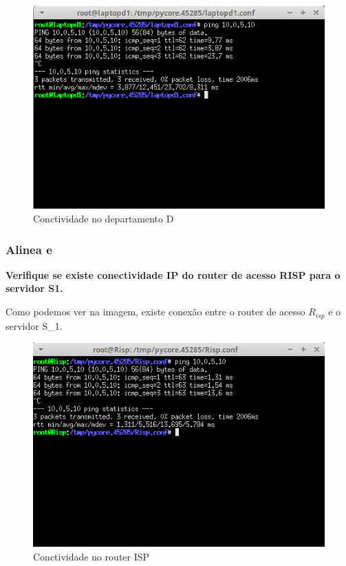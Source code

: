\documentclass{article}
\begin{document}
\begin{figure}[h]
	\centering
	\includegraphics[scale = 0.6]{conectividade-reded-ex1.png}
	\caption{Conctividade no departamento D}
\end{figure}

\subsubsection{Alinea e}
\textbf{Verifique se existe conectividade IP do router de acesso RISP para o servidor S1.}\\\par
Como podemos ver na imagem, existe conexão entre o router de acesso $R_{isp}$ e o servidor S_1.\\

\newpage

\begin{figure}[h]
	\centering
	\includegraphics[scale = 0.6]{conectividade-risp-ex1.png}
	\caption{Conctividade no router ISP}
\end{figure}
\end{document}
